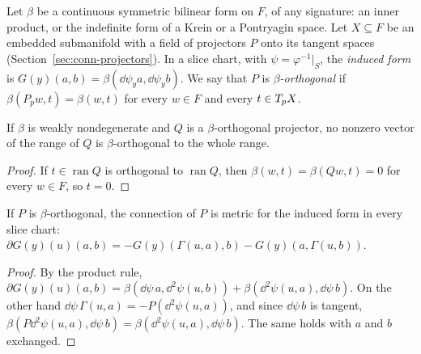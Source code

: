 Let $\beta$ be a continuous symmetric bilinear form on $F$, of any signature: an inner product,
or the indefinite form of a Krein or a Pontryagin space. Let $X \subseteq F$ be an embedded
submanifold with a field of projectors $P$ onto its tangent spaces
(Section~\ref{sec:conn-projectors}). In a slice chart, with $\psi = \varphi^{-1}|_S$, the
\emph{induced form} is $G(y)(a, b) = \beta(\dd\psi_y a, \dd\psi_y b)$. We say that $P$ is
\emph{$\beta$-orthogonal} if $\beta(P_p w, t) = \beta(w, t)$ for every $w \in F$ and every
$t \in T_p X$.

\begin{lemma}
  \label{lem:mt-orth-nondegenerate}
  \leanok
  If $\beta$ is weakly nondegenerate and $Q$ is a $\beta$-orthogonal projector, no nonzero vector
  of the range of $Q$ is $\beta$-orthogonal to the whole range.
\end{lemma}

\begin{proof}
  \leanok
  If $t \in \operatorname{ran} Q$ is orthogonal to $\operatorname{ran} Q$, then
  $\beta(w, t) = \beta(Qw, t) = 0$ for every $w \in F$, so $t = 0$.
\end{proof}

\begin{theorem}
  \label{thm:mt-gauss}
  \leanok
  If $P$ is $\beta$-orthogonal, the connection of $P$ is metric for the induced form in every
  slice chart:
  $\partial G(y)(u)(a, b) = -G(y)(\Gamma(u, a), b) - G(y)(a, \Gamma(u, b))$.
\end{theorem}

\begin{proof}
  \leanok
  By the product rule,
  $\partial G(y)(u)(a, b) = \beta(\dd\psi\, a, \dd^2\psi(u, b)) + \beta(\dd^2\psi(u, a), \dd\psi\, b)$.
  On the other hand $\dd\psi\,\Gamma(u, a) = -P(\dd^2\psi(u, a))$, and since $\dd\psi\, b$ is
  tangent, $\beta(P \dd^2\psi(u, a), \dd\psi\, b) = \beta(\dd^2\psi(u, a), \dd\psi\, b)$. The same
  holds with $a$ and $b$ exchanged.
\end{proof}

